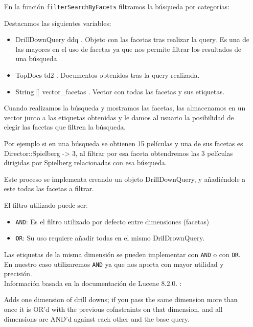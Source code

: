 \newpage 
En la función \texttt{filterSearchByFacets} filtramos la búsqueda por categorías:

Destacamos las siguientes variables:
	
\begin{itemize}
	\item DrillDownQuery ddq . Objeto con las facetas tras realizar la query. Es una de las mayores en el uso de facetas ya que nos permite filtrar los resultados de una búsqueda
	\item TopDocs td2 . Documentos obtenidos tras la query realizada.
	\item String [] vector\_facetas . Vector con todas las facetas y sus etiquetas.
\end{itemize}
	
	
Cuando realizamos la búsqueda y mostramos las facetas, las almacenamos en un vector junto a las etiquetas obtenidas y le damos al usuario la posibilidad de elegir las facetas que filtren la búsqueda. 

Por ejemplo si en una búsqueda se obtienen 15 películas y una de sus facetas es Director::Spielberg -> 3, al filtrar  por esa faceta obtendremos las 3 películas dirigidas por Spielberg relacionadas con esa búsqueda.


Este proceso se implementa creando un objeto DrillDownQuery, y añadiéndole a este todas las facetas a filtrar. 

El filtro utilizado puede ser:
\begin{itemize}
	\item \texttt{AND}: Es el filtro utilizado por defecto entre dimensiones (facetas)
	\item \texttt{OR}: Su uso requiere añadir todas en el mismo DrilDrownQuery.
\end{itemize}

Las etiquetas de la misma dimensión se pueden implementar con \texttt{AND} o con \texttt{OR}. En nuestro caso utilizaremos \texttt{AND} ya que nos aporta con mayor utilidad y precisión.  \\ 


Información basada en la documentación de Lucene 8.2.0. :

Adds one dimension of drill downs; if you pass the same dimension more than once it is OR'd with the previous cofnstraints on that dimension, and all dimensions are AND'd against each other and the base query.



